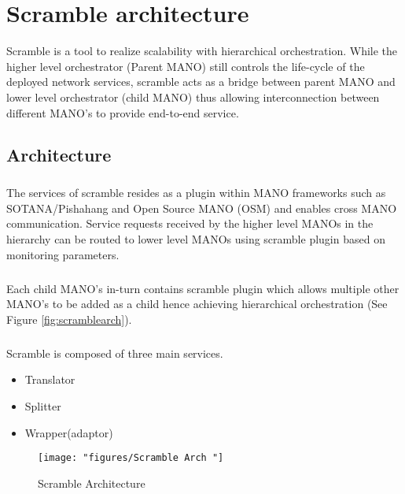 \chapter{Scramble architecture}
\label{ch:Scramble architecture}

Scramble is a tool to realize scalability with hierarchical orchestration. While the higher level orchestrator (Parent MANO) still controls the life-cycle of the deployed network services, scramble acts as a bridge between parent MANO and lower level orchestrator (child MANO) thus allowing interconnection between different MANO's to provide end-to-end service.  
 
\section{Architecture}
\paragraph{}
The services of scramble resides as a plugin within MANO frameworks such as SOTANA/Pishahang and Open Source MANO (OSM) and enables cross MANO communication. Service requests received by the higher level MANOs in the hierarchy can be routed to lower level MANOs using scramble plugin based on monitoring parameters.


\paragraph{}
Each child MANO's in-turn contains scramble plugin which allows multiple other MANO's to be added as a child hence achieving hierarchical orchestration (See Figure \ref{fig:scramblearch}).

\paragraph{}

Scramble is composed of three main services.
\begin{itemize}
	\item Translator
	\item Splitter
	\item Wrapper(adaptor)
	\end{itemize} 

\begin{figure}[h]
	\centering
	\texttt{[image: "figures/Scramble Arch "]}
	\caption{Scramble Architecture}
	\label{fig:scramble-arch-}
\end{figure}

